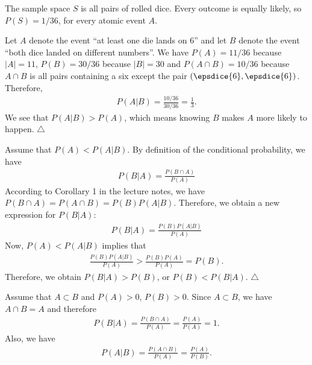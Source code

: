 	\begin{problem}
	The sample space $S$ is all pairs of rolled dice. Every outcome is equally likely, so $P (S) = 1/36$, for every atomic event $A$.
	
	Let $A$ denote the event ``at least one die lands on $6$'' and let $B$ denote the event ``both dice landed on different numbers''. We have $P (A) = 11/36$ because $|A| = 11$, $P (B) = 30/36$ because $|B| = 30$ and $P (A \cap B ) = 10 / 36$ because $A \cap B$ is all pairs containing a six except the pair $( \epsdice{6} , \epsdice{6} )$. Therefore,
		\begin{align*}
		P (A | B) = \frac{10/36}{30/36} = \frac{1}{3} .
		\end{align*}
	We see that $P (A | B) > P (A)$, which means knowing $B$ makes $A$ more likely to happen. \hfill $\triangle$
	\end{problem}

	\begin{problem}
	Assume that $P (A) < P (A |B)$. By definition of the conditional probability, we have
		\begin{align*}
		P (B |A) = \frac{P (B \cap A)}{P (A)}
		\end{align*}
	According to Corollary 1 in the lecture notes, we have $P (B \cap A ) = P (A \cap B) = P (B) P (A | B)$. Therefore, we obtain a new expression for $P (B | A)$:
		\begin{align}
		P (B | A) = \frac{P (B) P (A | B)}{P (A)}
		\end{align} 
	Now, $P (A) < P (A | B)$ implies that
		\begin{align}
		\frac{P (B) P (A | B)}{P (A)} > \frac{P (B) P (A)}{P (A)} = P (B) .
		\end{align} 
	Therefore, we obtain $P (B |A) >  P(B)$, or $P (B) < P (B |A)$. \hfill $\triangle$
	\end{problem}
	
	\begin{problem}
	Assume that $A \subset B$ and $P (A) > 0$, $P (B) > 0$. Since $A \subset B$, we have $A \cap B = A$ and therefore
		\begin{align*}
		P (B |A) = \frac{P (B \cap A)}{P (A)} = \frac{P (A)}{P (A)} = 1 .
		\end{align*}
	Also, we have
		\begin{align*}
		P (A | B) = \frac{P (A \cap B)}{P (A)} = \frac{P (A)}{P (B)}. \tag*{$\triangle$}
		\end{align*} 
	\end{problem}
	
